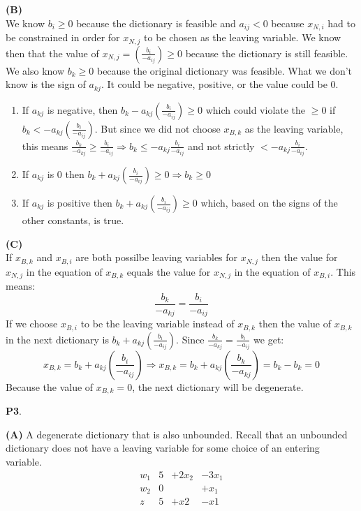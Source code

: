 \documentclass[11pt]{article}
\begin{document}
\medskip

\noindent \textbf{(B)}
\\
We know $b_i \ge 0$ because the dictionary is feasible and $a_{ij} < 0$ because $x_{N,i}$ had to be constrained in order for $x_{N,j}$ to be chosen as the leaving variable.  We know then that the value of $x_{N,j} = (\frac{b_i}{-a_{ij}}) \ge 0$ because the dictionary is still feasible.  We also know $b_k \ge 0$ because the original dictionary was feasible.  What we don't know is the sign of $a_{kj}$.  It could be negative, positive, or the value could be 0.
\begin{enumerate}
\item If $a_{kj}$ is negative, then 
$
b_k - a_{kj} \left(\frac{b_i}{ - a_{ij}}\right)  \geq 0
$
which could violate the $\ge 0$ if $b_k < -a_{kj} \left(\frac{b_i}{ - a_{ij}}\right)$.  But since we did not choose $x_{B,k}$ as the leaving variable, this means 
$\frac{b_k}{-a_{kj}} \ge \frac{b_i}{-a_{ij}} \Rightarrow b_k \le -a_{kj}\frac{b_i}{-a_{ij}}$ and not strictly $ < -a_{kj}\frac{b_i}{-a_{ij}}$.

\item If $a_{kj}$ is 0 then 
$
b_k + a_{kj} \left(\frac{b_i}{ - a_{ij}}\right)  \geq 0 \Rightarrow
b_k \geq 0
$

\item If $a_{kj}$ is positive then
$
b_k + a_{kj} \left(\frac{b_i}{ - a_{ij}}\right)  \geq 0
$
which, based on the signs of the other constants, is true.
\end{enumerate}

\medskip


\noindent\textbf{(C)}
\\
If $x_{B,k}$ and $x_{B,i}$ are both possilbe leaving variables for $x_{N,j}$ then the value for $x_{N,j}$ in the equation of $x_{B,k}$ equals the value for $x_{N,j}$ in the equation of $x_{B,i}$.  This means:
$$
\frac{b_k}{-a_{kj}} = \frac{b_i}{-a_{ij}}
$$
If we choose $x_{B,i}$ to be the leaving variable instead of $x_{B,k}$ then the value of $x_{B,k}$ in the next dictionary is $b_k + a_{kj}(\frac{b_i}{ - a_{ij}})$.  Since $\frac{b_k}{-a_{kj}} = \frac{b_i}{-a_{ij}}$ we get:
$$
x_{B,k} = b_k + a_{kj}(\frac{b_i}{ - a_{ij}}) \Rightarrow x_{B,k} = b_k + a_{kj}(\frac{b_k}{-a_{kj}}) = b_k - b_k = 0 
$$
Because the value of $x_{B,k} = 0$, the next dictionary will be degenerate.

\bigskip

\noindent\textbf{P3}.

\noindent\textbf{(A)} A degenerate dictionary that is also unbounded. 
Recall that an unbounded dictionary does not have a leaving variable for some
choice of an entering variable.
\\
\[\begin{array}{r|cccc}
w_1 & 5 & +2x_2 & -3x_1\\ 
w_2 & 0 && +x_1 \\
\hline
z & 5 & +x2 & -x1
\end{array}\]
\end{document}
